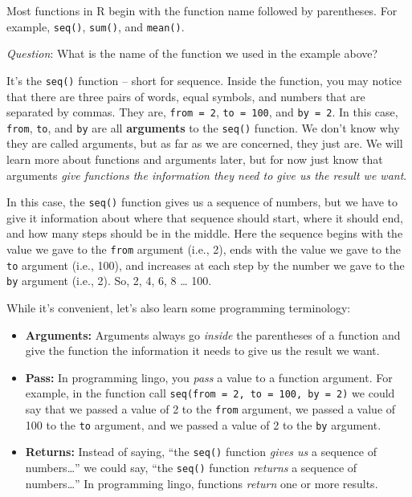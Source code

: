 \documentclass[
  letterpaper,
  DIV=11,
  numbers=noendperiod]{scrreprt}
\begin{document}
Most functions in R begin with the function name followed by
parentheses. For example, \texttt{seq()}, \texttt{sum()}, and
\texttt{mean()}.

\emph{Question}: What is the name of the function we used in the example
above?

It's the \texttt{seq()} function -- short for sequence. Inside the
function, you may notice that there are three pairs of words, equal
symbols, and numbers that are separated by commas. They are,
\texttt{from\ =\ 2}, \texttt{to\ =\ 100}, and \texttt{by\ =\ 2}. In this
case, \texttt{from}, \texttt{to}, and \texttt{by} are all
\textbf{arguments} to the \texttt{seq()} function. We don't know why
they are called arguments, but as far as we are concerned, they just
are. We will learn more about functions and arguments later, but for now
just know that arguments \emph{give functions the information they need
to give us the result we want}.

In this case, the \texttt{seq()} function gives us a sequence of
numbers, but we have to give it information about where that sequence
should start, where it should end, and how many steps should be in the
middle. Here the sequence begins with the value we gave to the
\texttt{from} argument (i.e., 2), ends with the value we gave to the
\texttt{to} argument (i.e., 100), and increases at each step by the
number we gave to the \texttt{by} argument (i.e., 2). So, 2, 4, 6, 8
\ldots{} 100.

While it's convenient, let's also learn some programming terminology:

\begin{itemize}
\item
  \textbf{Arguments:} Arguments always go \emph{inside} the parentheses
  of a function and give the function the information it needs to give
  us the result we want.
\item
  \textbf{Pass:} In programming lingo, you \emph{pass} a value to a
  function argument. For example, in the function call
  \texttt{seq(from\ =\ 2,\ to\ =\ 100,\ by\ =\ 2)} we could say that we
  passed a value of 2 to the \texttt{from} argument, we passed a value
  of 100 to the \texttt{to} argument, and we passed a value of 2 to the
  \texttt{by} argument.
\item
  \textbf{Returns:} Instead of saying, ``the \texttt{seq()} function
  \emph{gives us} a sequence of numbers\ldots{}'' we could say, ``the
  \texttt{seq()} function \emph{returns} a sequence of numbers\ldots{}''
  In programming lingo, functions \emph{return} one or more results.
\end{itemize}
\end{document}
